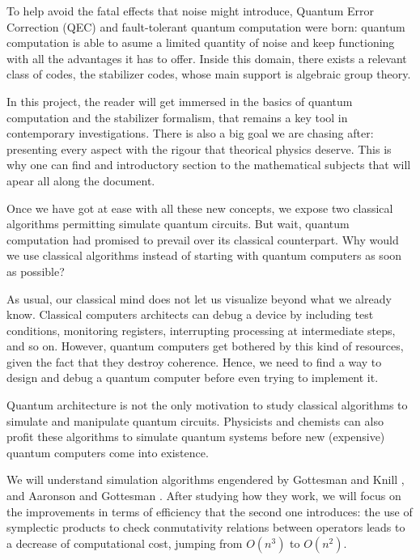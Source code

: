 \documentclass[11pt,a4paper,twoside,pdf]{article}
\numberwithin{equation}{section}
\begin{document}
\begin{center}
	
	\begin{minipage}{0.8\linewidth}
		To help avoid the fatal effects that noise might introduce, Quantum Error Correction (QEC) and fault-tolerant quantum computation were born: quantum computation is able to asume a limited quantity of noise and keep functioning with all the advantages it has to offer. Inside this domain, there exists a relevant class of codes, the stabilizer codes, whose main support is algebraic group theory.
		
		In this project, the reader will get immersed in the basics of quantum computation and the stabilizer formalism, that remains a key tool in contemporary investigations. There is also a big goal we are chasing after: presenting every aspect with the rigour that theorical physics deserve. This is why one can find and introductory section to the mathematical subjects that will apear all along the document.
		
		Once we have got at ease with all these new concepts, we expose two classical algorithms permitting simulate quantum circuits. But wait, quantum computation had promised to prevail over its classical counterpart. Why would we use classical algorithms instead of starting with quantum computers as soon as possible?
		
		As usual, our classical mind does not let us visualize beyond what we already know. Classical computers architects can debug a device by including test conditions, monitoring registers, interrupting processing at intermediate steps, and so on. However, quantum computers get bothered by this kind of resources, given the fact that they destroy coherence. Hence, we need to find a way to design and debug a quantum computer before even trying to implement it.
		
		Quantum architecture is not the only motivation to study  classical algorithms to simulate and manipulate quantum circuits. Physicists and chemists can also profit these algorithms to simulate quantum systems before new (expensive) quantum computers come into existence.
		
		We will understand simulation algorithms engendered by Gottesman and Knill \cite{NielsenChuang}, and Aaronson and Gottesman \cite{Aaronson}. After studying how they work, we will focus on the improvements in terms of efficiency that the second one introduces: the use of symplectic products to check conmutativity relations between operators leads to a decrease of computational cost, jumping from $O(n^3)$ to $O(n^2)$.
		

\end{minipage}
\end{center}
\end{document}
